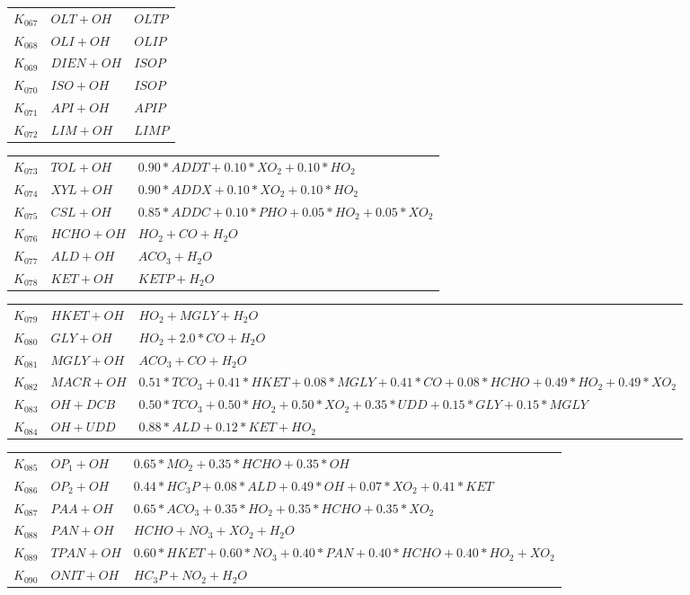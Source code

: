 {\begin{tabular}{l@{\,:\,}p{0.2\chfwidth}@{$\quad\longrightarrow\quad$}p{0.6\chfwidth}}
$K_{067}$ & $OLT+OH$ & $OLTP$ \\
$K_{068}$ & $OLI+OH$ & $OLIP$ \\
$K_{069}$ & $DIEN+OH$ & $ISOP$ \\
$K_{070}$ & $ISO+OH$ & $ISOP$ \\
$K_{071}$ & $API+OH$ & $APIP$ \\
$K_{072}$ & $LIM+OH$ & $LIMP$ \\
\end{tabular}

\begin{tabular}{l@{\,:\,}p{0.2\chfwidth}@{$\quad\longrightarrow\quad$}p{0.6\chfwidth}}
$K_{073}$ & $TOL+OH$ & $0.90*ADDT+0.10*XO_{2}+0.10*HO_{2}$ \\
$K_{074}$ & $XYL+OH$ & $0.90*ADDX+0.10*XO_{2}+0.10*HO_{2}$ \\
$K_{075}$ & $CSL+OH$ & $0.85*ADDC+0.10*PHO+0.05*HO_{2}+0.05*XO_{2}$ \\
$K_{076}$ & $HCHO+OH$ & $HO_{2}+CO+H_{2}O$ \\
$K_{077}$ & $ALD+OH$ & $ACO_{3}+H_{2}O$ \\
$K_{078}$ & $KET+OH$ & $KETP+H_{2}O$ \\
\end{tabular}

\begin{tabular}{l@{\,:\,}p{0.2\chfwidth}@{$\quad\longrightarrow\quad$}p{0.6\chfwidth}}
$K_{079}$ & $HKET+OH$ & $HO_{2}+MGLY+H_{2}O$ \\
$K_{080}$ & $GLY+OH$ & $HO_{2}+2.0*CO+H_{2}O$ \\
$K_{081}$ & $MGLY+OH$ & $ACO_{3}+CO+H_{2}O$ \\
$K_{082}$ & $MACR+OH$ & $0.51*TCO_{3}+0.41*HKET+0.08*MGLY+0.41*CO+0.08*HCHO+0.49*HO_{2}+0.49*XO_{2}$ \\
$K_{083}$ & $OH+DCB$ & $0.50*TCO_{3}+0.50*HO_{2}+0.50*XO_{2}+0.35*UDD+0.15*GLY+0.15*MGLY$ \\
$K_{084}$ & $OH+UDD$ & $0.88*ALD+0.12*KET+HO_{2}$ \\
\end{tabular}

\begin{tabular}{l@{\,:\,}p{0.2\chfwidth}@{$\quad\longrightarrow\quad$}p{0.6\chfwidth}}
$K_{085}$ & $OP_{1}+OH$ & $0.65*MO_{2}+0.35*HCHO+0.35*OH$ \\
$K_{086}$ & $OP_{2}+OH$ & $0.44*HC_{3}P+0.08*ALD+0.49*OH+0.07*XO_{2}+0.41*KET$ \\
$K_{087}$ & $PAA+OH$ & $0.65*ACO_{3}+0.35*HO_{2}+0.35*HCHO+0.35*XO_{2}$ \\
$K_{088}$ & $PAN+OH$ & $HCHO+NO_{3}+XO_{2}+H_{2}O$ \\
$K_{089}$ & $TPAN+OH$ & $0.60*HKET+0.60*NO_{3}+0.40*PAN+0.40*HCHO+0.40*HO_{2}+XO_{2}$ \\
$K_{090}$ & $ONIT+OH$ & $HC_{3}P+NO_{2}+H_{2}O$ \\
\end{tabular}

}
